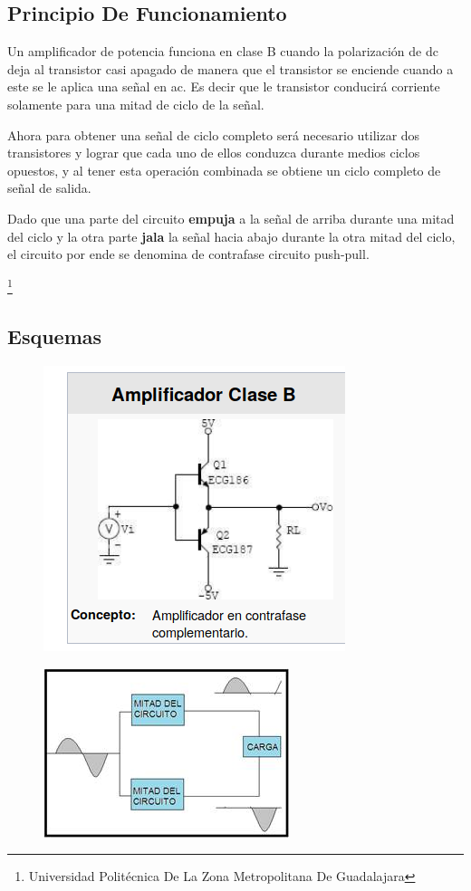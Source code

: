 \documentclass[11pt,a4paper]{article}
\begin{document}
\subsection{Principio De Funcionamiento}

Un amplificador de potencia funciona en clase B cuando la polarización de dc deja al transistor casi apagado de manera que el transistor se enciende cuando a este se le aplica una señal en ac. Es decir que le transistor conducirá corriente solamente para una mitad de ciclo de la señal.

Ahora para obtener una señal de ciclo completo será necesario utilizar dos transistores y lograr que cada uno de ellos conduzca durante medios ciclos opuestos, y al tener esta operación combinada se obtiene un ciclo completo de señal de salida.

Dado que una parte del circuito \textbf{empuja} a la señal de arriba durante una mitad del ciclo y la otra parte \textbf{jala} la señal hacia abajo durante la otra mitad del ciclo, el circuito por ende se denomina de contrafase circuito push-pull.

\footnote{Universidad Politécnica De La Zona Metropolitana De Guadalajara} 

\newpage

\subsection{Esquemas}
\begin{figure}[hbtp]
\centering
\includegraphics[scale=0.60]{ejemplo1.png}
\end{figure}
 
\begin{figure}[hbtp]
\centering
\includegraphics[scale=0.90]{ejemplo2.png}
\end{figure}
\end{document}
